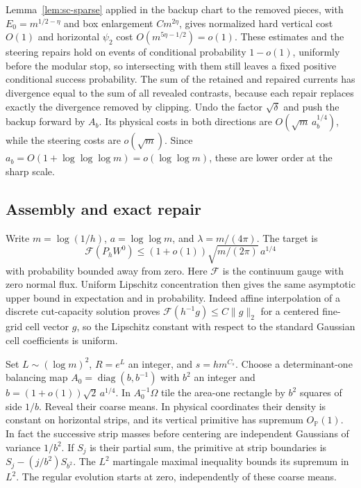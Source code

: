 \documentclass[11pt]{article}
\newcommand{\1}{\mathbf{1}}
\numberwithin{equation}{section}
\newcommand{\diag}{\operatorname{diag}}
\begin{document}
Lemma~\ref{lem:sc-sparse} applied in the backup chart
to the removed pieces, with \(E_0=m^{1/2-\eta}\) and
box enlargement \(C m^{2\eta}\), gives normalized hard
vertical cost \(O(1)\) and horizontal \(\psi_2\) cost
\(O(m^{5\eta-1/2})=o(1)\). These estimates and the steering
repairs hold on events of conditional probability \(1-o(1)\),
uniformly before the modular stop, so intersecting with them
still leaves a fixed positive conditional success probability.
The sum of the retained and repaired currents has divergence
equal to the sum of all revealed contrasts, because each
repair replaces exactly the divergence removed by clipping.
Undo the factor \(\sqrt\delta\) and push the backup forward
by \(A_b\). Its physical costs in both directions are
\(O(\sqrt m\,a_b^{1/4})\), while the steering costs are
\(o(\sqrt m)\). Since \(a_b=O(1+\log\log\log m)
=o(\log\log m)\), these are lower order at the sharp scale.

\subsection{Assembly and exact repair}
\label{sec:sharp-gauss-upper}

Write $m=\log(1/h)$, $a=\log\log m$, and $\lambda=m/(4\pi)$.
The target is
\[
 \mathcal F(P_hW^0)\le (1+o(1))\sqrt{m/(2\pi)}\,a^{1/4}
\]
with probability bounded away from zero. Here $\mathcal F$ is the
continuum gauge with zero normal flux. Uniform Lipschitz concentration
then gives the same asymptotic upper bound in expectation and in
probability. Indeed affine interpolation of a discrete cut-capacity
solution proves $\mathcal F(h^{-1}g)\le C\|g\|_2$ for a centered
fine-grid cell vector $g$, so the Lipschitz constant with respect to
the standard Gaussian cell coefficients is uniform.

Set $L\sim(\log m)^2$, $R=e^L$ an integer, and $s=hm^{C_s}$.
Choose a determinant-one balancing map
$A_0=\diag(b,b^{-1})$ with $b^2$ an integer and
$b=(1+o(1))\sqrt2\,a^{1/4}$. In $A_0^{-1}\Omega$ tile the area-one
rectangle by $b^2$ squares of side $1/b$. Reveal their coarse
means. In physical coordinates their density is constant on
horizontal strips, and its vertical primitive has supremum
\(O_{\mathbb P}(1)\). In fact the successive strip masses before
centering are independent Gaussians of variance \(1/b^2\).
If \(S_j\) is their partial sum, the primitive at strip boundaries
is \(S_j-(j/b^2)S_{b^2}\). The \(L^2\) martingale maximal
inequality bounds its supremum in \(L^2\).
The regular evolution starts at zero, independently of these
coarse means.
\end{document}
